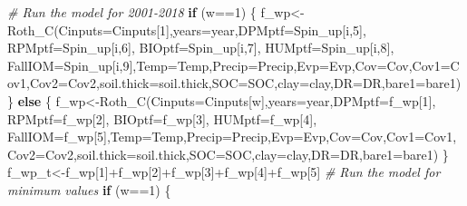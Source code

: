 \documentclass[
  10pt,
  b5paper,
]{book}
\newenvironment{Shaded}{\begin{snugshade}}{\end{snugshade}}
\newcommand{\AttributeTok}[1]{\textcolor[rgb]{0.77,0.63,0.00}{#1}}
\newcommand{\CommentTok}[1]{\textcolor[rgb]{0.56,0.35,0.01}{\textit{#1}}}
\newcommand{\ControlFlowTok}[1]{\textcolor[rgb]{0.13,0.29,0.53}{\textbf{#1}}}
\newcommand{\DecValTok}[1]{\textcolor[rgb]{0.00,0.00,0.81}{#1}}
\newcommand{\FunctionTok}[1]{\textcolor[rgb]{0.00,0.00,0.00}{#1}}
\newcommand{\NormalTok}[1]{#1}
\newcommand{\OtherTok}[1]{\textcolor[rgb]{0.56,0.35,0.01}{#1}}
\newcommand{\SpecialCharTok}[1]{\textcolor[rgb]{0.00,0.00,0.00}{#1}}
\begin{document}
\begin{Shaded}
\begin{Highlighting}[]
\CommentTok{\# Run the model for 2001{-}2018 }
\ControlFlowTok{if}\NormalTok{ (w}\SpecialCharTok{==}\DecValTok{1}\NormalTok{) \{}
\NormalTok{f\_wp}\OtherTok{\textless{}{-}}\FunctionTok{Roth\_C}\NormalTok{(}\AttributeTok{Cinputs=}\NormalTok{Cinputs[}\DecValTok{1}\NormalTok{],}\AttributeTok{years=}\NormalTok{year,}\AttributeTok{DPMptf=}\NormalTok{Spin\_up[i,}\DecValTok{5}\NormalTok{], }\AttributeTok{RPMptf=}\NormalTok{Spin\_up[i,}\DecValTok{6}\NormalTok{], }\AttributeTok{BIOptf=}\NormalTok{Spin\_up[i,}\DecValTok{7}\NormalTok{], }\AttributeTok{HUMptf=}\NormalTok{Spin\_up[i,}\DecValTok{8}\NormalTok{], }\AttributeTok{FallIOM=}\NormalTok{Spin\_up[i,}\DecValTok{9}\NormalTok{],}\AttributeTok{Temp=}\NormalTok{Temp,}\AttributeTok{Precip=}\NormalTok{Precip,}\AttributeTok{Evp=}\NormalTok{Evp,}\AttributeTok{Cov=}\NormalTok{Cov,}\AttributeTok{Cov1=}\NormalTok{Cov1,}\AttributeTok{Cov2=}\NormalTok{Cov2,}\AttributeTok{soil.thick=}\NormalTok{soil.thick,}\AttributeTok{SOC=}\NormalTok{SOC,}\AttributeTok{clay=}\NormalTok{clay,}\AttributeTok{DR=}\NormalTok{DR,}\AttributeTok{bare1=}\NormalTok{bare1)}
\NormalTok{\} }\ControlFlowTok{else}\NormalTok{ \{}
\NormalTok{f\_wp}\OtherTok{\textless{}{-}}\FunctionTok{Roth\_C}\NormalTok{(}\AttributeTok{Cinputs=}\NormalTok{Cinputs[w],}\AttributeTok{years=}\NormalTok{year,}\AttributeTok{DPMptf=}\NormalTok{f\_wp[}\DecValTok{1}\NormalTok{], }\AttributeTok{RPMptf=}\NormalTok{f\_wp[}\DecValTok{2}\NormalTok{], }\AttributeTok{BIOptf=}\NormalTok{f\_wp[}\DecValTok{3}\NormalTok{], }\AttributeTok{HUMptf=}\NormalTok{f\_wp[}\DecValTok{4}\NormalTok{], }\AttributeTok{FallIOM=}\NormalTok{f\_wp[}\DecValTok{5}\NormalTok{],}\AttributeTok{Temp=}\NormalTok{Temp,}\AttributeTok{Precip=}\NormalTok{Precip,}\AttributeTok{Evp=}\NormalTok{Evp,}\AttributeTok{Cov=}\NormalTok{Cov,}\AttributeTok{Cov1=}\NormalTok{Cov1,}\AttributeTok{Cov2=}\NormalTok{Cov2,}\AttributeTok{soil.thick=}\NormalTok{soil.thick,}\AttributeTok{SOC=}\NormalTok{SOC,}\AttributeTok{clay=}\NormalTok{clay,}\AttributeTok{DR=}\NormalTok{DR,}\AttributeTok{bare1=}\NormalTok{bare1)}
\NormalTok{\}}
\NormalTok{f\_wp\_t}\OtherTok{\textless{}{-}}\NormalTok{f\_wp[}\DecValTok{1}\NormalTok{]}\SpecialCharTok{+}\NormalTok{f\_wp[}\DecValTok{2}\NormalTok{]}\SpecialCharTok{+}\NormalTok{f\_wp[}\DecValTok{3}\NormalTok{]}\SpecialCharTok{+}\NormalTok{f\_wp[}\DecValTok{4}\NormalTok{]}\SpecialCharTok{+}\NormalTok{f\_wp[}\DecValTok{5}\NormalTok{]}
\CommentTok{\# Run the model for minimum values}
\ControlFlowTok{if}\NormalTok{ (w}\SpecialCharTok{==}\DecValTok{1}\NormalTok{) \{}

\end{Highlighting}
\end{Shaded}
\end{document}
